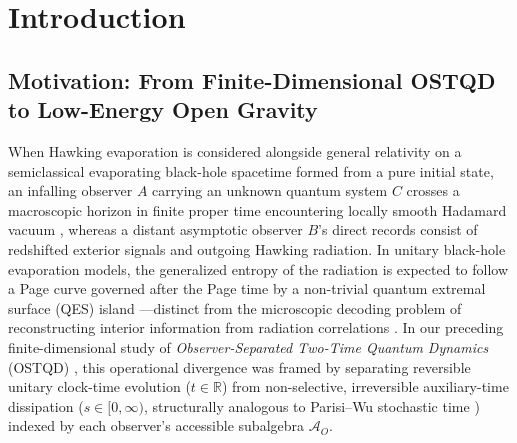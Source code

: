\documentclass[11pt,a4paper]{article}
\theoremstyle{definition}
\theoremstyle{remark}
\newcommand{\cA}{\mathcal{A}}
\newcommand{\bbR}{\mathbb{R}}
\newcommand{\1}{\mathbf{1}}
\begin{document}
\newpage
\tableofcontents
\vspace{1em}

\section{Introduction}\label{sec:intro}

\subsection{Motivation: From Finite-Dimensional OSTQD to Low-Energy Open Gravity}\label{sec:motivation}

When Hawking evaporation \cite{Hawking1975,Page1976,Page1993} is considered alongside general relativity on a semiclassical evaporating black-hole spacetime formed from a pure initial state, an infalling observer $A$ carrying an unknown quantum system $C$ crosses a macroscopic horizon in finite proper time encountering locally smooth Hadamard vacuum \cite{KayWald1991,Radzikowski1996,UnruhWald2017}, whereas a distant asymptotic observer $B$'s direct records consist of redshifted exterior signals and outgoing Hawking radiation. In unitary black-hole evaporation models, the generalized entropy of the radiation is expected to follow a Page curve governed after the Page time by a non-trivial quantum extremal surface (QES) island \cite{AEMM2019,Penington2020,AlmheiriIslands2020}---distinct from the microscopic decoding problem of reconstructing interior information from radiation correlations \cite{Susskind1993,AMPS2013,Akers2022}. In our preceding finite-dimensional study of \emph{Observer-Separated Two-Time Quantum Dynamics} (OSTQD) \cite{Soga2026OSTQD}, this operational divergence was framed by separating reversible unitary clock-time evolution ($t \in \bbR$) from non-selective, irreversible auxiliary-time dissipation ($s \in [0,\infty)$, structurally analogous to Parisi--Wu stochastic time \cite{ParisiWu1981}) indexed by each observer's accessible subalgebra $\cA_O$.
\end{document}
